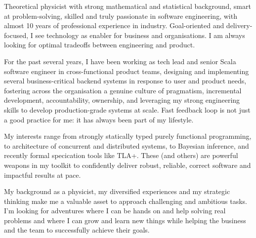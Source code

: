 
\begin{cvparagraph}
Theoretical physicist with strong mathematical and statistical 
background, smart at problem-solving, skilled and truly passionate in software engineering, with almost 10 years of professional experience in industry. Goal-oriented and delivery-focused, I see technology as enabler for business and organisations. I am always looking for optimal tradeoffs between engineering and product.

  For the past several years, I have been working as tech lead and senior Scala software engineer in cross-functional product teams, designing and implementing several business-critical backend systems in response to user and product needs, fostering  across the organisation a genuine culture of pragmatism, incremental development, accountability, ownership, and leveraging my strong engineering skills 
  to develop production-grade systems at scale. Fast feedback loop is not just a good practice for me: it has always been part of my lifestyle.

  My interests range from strongly statically typed purely functional programming, to architecture of concurrent and distributed systems, to Bayesian inference, and recently formal specication tools like TLA+. These (and others) are powerful weapons in my toolkit to confidently deliver robust, reliable, correct software and impactful results at pace. 

My background as a physicist, my diversified experiences and my strategic thinking make me a valuable asset to approach challenging and ambitious tasks. I'm looking for adventures where I can be hands on and help solving real problems and where I can grow and learn new things while helping the business and the team to successfully achieve their goals. 
\end{cvparagraph}
